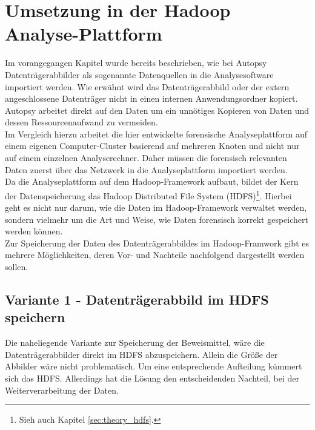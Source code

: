 \section{Umsetzung in der Hadoop Analyse-Plattform}

Im vorangegangen Kapitel wurde bereits beschrieben, wie bei Autopsy Datenträgerabbilder als sogenannte Datenquellen in die Analysesoftware importiert werden. Wie erwähnt wird das Datenträgerabbild oder der extern angeschlossene Datenträger nicht in einen internen Anwendungsordner kopiert. Autopsy arbeitet direkt auf den Daten um ein unnötiges Kopieren von Daten und dessen Ressourcenaufwand zu vermeiden. \\

\noindent
Im Vergleich hierzu arbeitet die hier entwickelte forensische Analyseplattform auf einem eigenen Computer-Cluster basierend auf mehreren Knoten und nicht nur auf einem einzelnen Analyserechner. Daher müssen die forensisch relevanten Daten zuerst über das Netzwerk in die Analyseplattform importiert werden. \\
Da die Analyseplattform auf dem Hadoop-Framework aufbaut, bildet der Kern der Datenspeicherung das Hadoop Distributed File System (HDFS)\footnote{Sieh auch Kapitel \ref{sec:theory_hdfs}.}. Hierbei geht es nicht nur darum, wie die Daten im Hadoop-Framework verwaltet werden, sondern vielmehr um die Art und Weise, wie Daten forensisch korrekt gespeichert werden können.\\


\noindent
Zur Speicherung der Daten des Datenträgerabbildes im Hadoop-Framwork gibt es mehrere Möglichkeiten, deren Vor- und Nachteile nachfolgend dargestellt werden sollen.

\subsection{Variante 1 - Datenträgerabbild im HDFS speichern}
\label{subsec:variant1}

Die naheliegende Variante zur Speicherung der Beweismittel, wäre die Datenträgerabbilder direkt im HDFS abzuspeichern. Allein die Größe der Abbilder wäre nicht problematisch. Um eine entsprechende Aufteilung kümmert sich das HDFS. Allerdings hat die Lösung den entscheidenden Nachteil, bei der Weiterverarbeitung der Daten.\\ 


